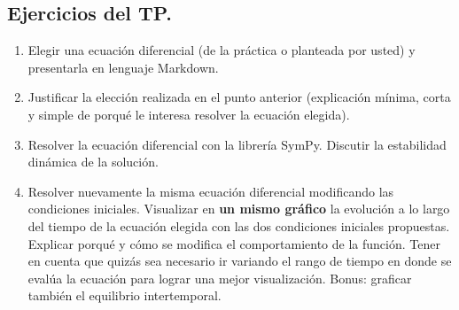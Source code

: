 \documentclass[a4paper,11pt]{article}
\begin{document}
\subsection*{Ejercicios del TP.}
	\begin{enumerate}
		\item Elegir una ecuación diferencial (de la práctica o planteada por usted) y presentarla en lenguaje Markdown.
		\item Justificar la elección realizada en el punto anterior (explicación mínima, corta y simple de porqué le interesa resolver la ecuación elegida).
		\item Resolver la ecuación diferencial con la librería SymPy. Discutir la estabilidad dinámica de la solución. 
		\item Resolver nuevamente la misma ecuación diferencial modificando las condiciones iniciales. Visualizar en \textbf{un mismo gráfico} la evolución a lo largo del tiempo de la ecuación elegida con las dos condiciones iniciales propuestas. Explicar porqué y cómo se modifica el comportamiento de la función. Tener en cuenta que quizás sea necesario ir variando el rango de tiempo en donde se evalúa la ecuación para lograr una mejor visualización. Bonus: graficar también el equilibrio intertemporal.
		

\end{enumerate}
\end{document}
